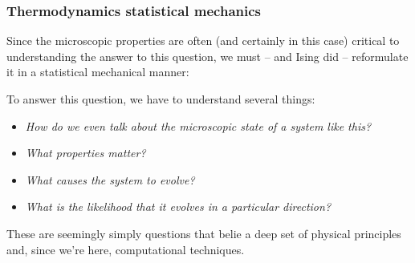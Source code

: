 \documentclass[hyperref={colorlinks=true}]{beamer}
\begin{document}
\begin{frame}%
  \frametitle{Thermodynamics \ra statistical mechanics}
  
  
  Since the microscopic properties are often (and certainly in this case) critical to understanding the answer to this question, we must -- and Ising did -- reformulate it in a statistical mechanical manner:
  
  \pause
  
  \vspace{0.1cm}
  
  \begin{ucblock}{}
  \end{ucblock}
  
  \vspace{0.1cm}
  
  \pause
  
  To answer this question, we have to understand several things:
  
  \begin{itemize}[<+->]
    \item \textit{How do we even talk about the microscopic state of a system like this?}
    \item \textit{What properties matter?}
    \item \textit{What causes the system to evolve?}
    \item \textit{What is the likelihood that it evolves in a particular direction?}
  \end{itemize}

  These are seemingly simply questions that belie a deep set of physical principles and, since we're here, computational techniques.

\end{frame}

\end{document}
